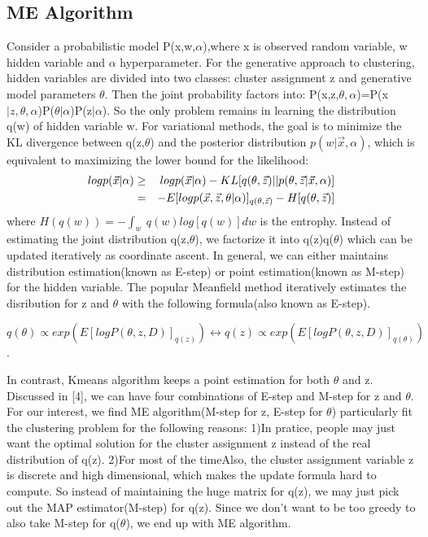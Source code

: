 \documentclass{article}
\begin{document}
\subsection{ME Algorithm}
Consider a probabilistic model P(x,w,$\alpha$),where x is observed random variable, w hidden variable and $\alpha$ hyperparameter.   
For the generative approach to clustering, hidden variables are divided into two classes: cluster assignment z and generative model parameters $\theta$.  
Then the joint probability factors into: P(x,z,$\theta,\alpha$)=P(x$|z,\theta,\alpha$)P($\theta|\alpha$)P(z$|\alpha$). 
So the only problem remains in learning the distribution q(w) of hidden variable w.
For variational methods, the goal is to minimize the KL divergence between q(z,$\theta$) and the posterior distribution $p(w |\vec x,\alpha)$, which 
is equivalent to maximizing the lower bound for the likelihood:
\begin{eqnarray*}
log p(\vec x |\alpha)
&\geq&log p(\vec x | \alpha)-KL[q(\theta,\vec z) || p(\theta,\vec z | \vec x,\alpha)] \\
&=&-\boldmath{E}[log p(\vec x,\vec z, \theta | \alpha)]_{q(\theta,\vec z)}-H[q(\theta,\vec z)] 
\end{eqnarray*}
where $H(q(w))=-\int_w \ q(w)log [q(w)] dw$ is the entrophy.
Instead of estimating the joint distribution q(z,$\theta$), we factorize it into q(z)q($\theta$) which can be updated iteratively as coordinate ascent. 
In general, we can either maintains distribution estimation(known as E-step) or point estimation(known as M-step) for the hidden variable.
The popular Meanfield method iteratively estimates the disribution for z and $\theta$ with the following formula(also known as E-step).
\begin{center}
$q (\theta ) \propto exp(E[log P(\theta, z, D)]_{q(z)} ) \longleftrightarrow q (z) \propto  exp(E[log P(\theta, z, D)]_{q (\theta )})$.
\end{center}
In contrast, Kmeans algorithm keeps a point estimation for both $\theta$ and z. 
Discussed in [4], we can have four combinations of E-step and M-step for z and $\theta$. 
For our interest, we find ME algorithm(M-step for z, E-step for $\theta$) particularly fit the clustering problem for the following reasons:
1)In pratice, people may just want the optimal solution for the cluster assignment z instead of the real distribution of q(z).
2)For most of the timeAlso, the cluster assignment variable z is discrete and high dimensional, which makes the update formula hard to compute. 
So instead of maintaining the huge matrix for q(z), we may just pick out the MAP estimator(M-step) for q(z).
Since we don't want to be too greedy to also take M-step for q($\theta$), we end up with ME algorithm.
\end{document}
